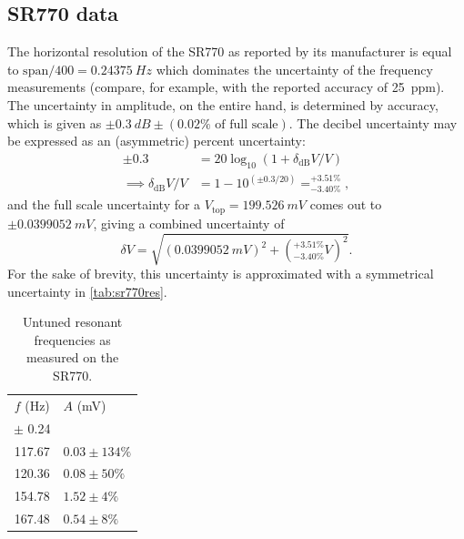 \documentclass{article}
\begin{document}
\subsection{SR770 data}
The horizontal resolution of the SR770 as reported by its manufacturer is equal to $\text{span}/400=\qty{0.24375}{Hz}$ which dominates the uncertainty of the frequency measurements (compare, for example, with the reported accuracy of \qty{25}{ppm}). The uncertainty in amplitude, on the entire hand, is determined by accuracy, which is given as $\pm\qty{0.3}{dB}\pm (0.02\%\text{ of full scale})$. The decibel uncertainty may be expressed as an (asymmetric) percent uncertainty:
\begin{equation*}
	\begin{aligned}
		\pm 0.3 &= 20 \log_{10}\left( 1 + \delta_\text{dB}V/V \right) \\
		\implies \delta_\text{dB}V/V &= 1- 10^{(\pm0.3/20)} = ^{+3.51\%}_{-3.40\%}%
,
	\end{aligned}
\end{equation*}
and the full scale uncertainty for a $V_\text{top}=\qty{199.526}{mV}$ comes out to $\pm \qty{0.0399052}{mV}$, giving a combined uncertainty of 
\begin{equation*}
	\delta V = \sqrt{\left( \qty{0.0399052}{mV} \right)^2 + \left( ^{+3.51\%}_{-3.40\%} V \right)^2}.
\end{equation*}
For the sake of brevity, this uncertainty is approximated with a symmetrical uncertainty in \autoref{tab:sr770res}.



\begin{table}
  \centering
  \caption{Untuned resonant frequencies as measured on the SR770.}
  \begin{tabular}{@{}cl@{}}
    \toprule
    $f$ (\unit{Hz}) & $A$ (\unit{mV}) \\
	$\pm$ 0.24 & \\
    \midrule
    117.67 & $0.03 \pm 134\%$ \\
	120.36 & $0.08 \pm 50\%$ \\
	154.78 & $1.52 \pm 4\%$ \\
	167.48 & $0.54 \pm 8\%$ \\
    \bottomrule
  \end{tabular}
  \label{tab:sr770res}
\end{table}

\begin{figure}
		\centering
		\def\svgwidth{.5\linewidth}
		
		\caption{}
\end{figure}
\end{document}
